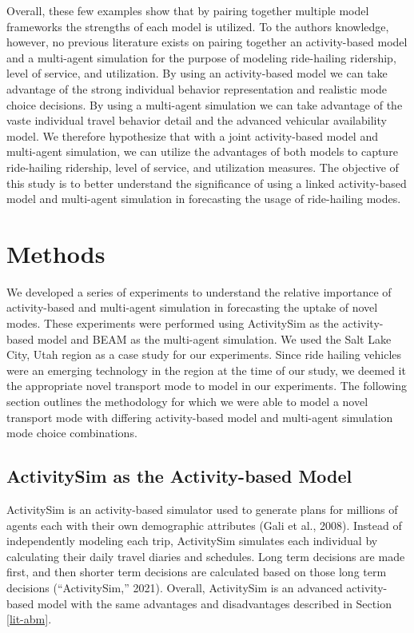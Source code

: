\documentclass[fancy, masters]{byuthesis}
\begin{document}
Overall, these few examples show that by pairing together multiple model frameworks the strengths of each model is utilized. To the authors knowledge, however, no previous literature exists on pairing together an activity-based model and a multi-agent simulation for the purpose of modeling ride-hailing ridership, level of service, and utilization. By using an activity-based model we can take advantage of the strong individual behavior representation and realistic mode choice decisions. By using a multi-agent simulation we can take advantage of the vaste individual travel behavior detail and the advanced vehicular availability model. We therefore hypothesize that with a joint activity-based model and multi-agent simulation, we can utilize the advantages of both models to capture ride-hailing ridership, level of service, and utilization measures. The objective of this study is to better understand the significance of using a linked activity-based model and multi-agent simulation in forecasting the usage of ride-hailing modes.

\hypertarget{methods}{%
\chapter{Methods}\label{methods}}

We developed a series of experiments to understand the relative importance of activity-based and multi-agent simulation in forecasting the uptake of novel modes. These experiments were performed using ActivitySim as the activity-based model and BEAM as the multi-agent simulation. We used the Salt Lake City, Utah region as a case study for our experiments. Since ride hailing vehicles were an emerging technology in the region at the time of our study, we deemed it the appropriate novel transport mode to model in our experiments. The following section outlines the methodology for which we were able to model a novel transport mode with differing activity-based model and multi-agent simulation mode choice combinations.

\hypertarget{meth-asim}{%
\section{ActivitySim as the Activity-based Model}\label{meth-asim}}

ActivitySim is an activity-based simulator used to generate plans for millions of agents each with their own demographic attributes (Gali et al., 2008). Instead of independently modeling each trip, ActivitySim simulates each individual by calculating their daily travel diaries and schedules. Long term decisions are made first, and then shorter term decisions are calculated based on those long term decisions ({``ActivitySim,''} 2021). Overall, ActivitySim is an advanced activity-based model with the same advantages and disadvantages described in Section \ref{lit-abm}.
\end{document}
